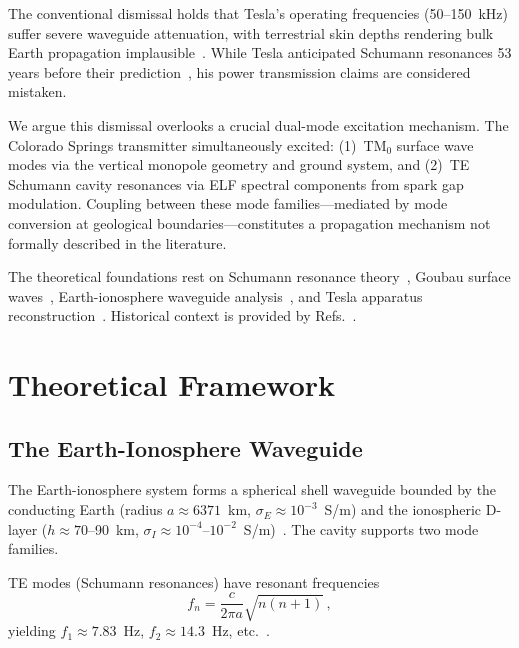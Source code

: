 \documentclass[12pt,preprint,amsmath,amssymb]{revtex4-2}
\begin{document}
The conventional dismissal holds that Tesla's operating frequencies (50--150~kHz) suffer severe
waveguide attenuation, with terrestrial skin depths rendering bulk Earth propagation
implausible~\cite{jackson1999}. While Tesla anticipated Schumann resonances 53 years before their
prediction~\cite{schumann1952}, his power transmission claims are considered mistaken.

We argue this dismissal overlooks a crucial dual-mode excitation mechanism. The Colorado Springs
transmitter simultaneously excited: (1)~TM$_0$ surface wave modes via the vertical monopole geometry
and ground system, and (2)~TE Schumann cavity resonances via ELF spectral components from spark gap
modulation. Coupling between these mode families---mediated by mode conversion at geological
boundaries---constitutes a propagation mechanism not formally described in the literature.

The theoretical foundations rest on Schumann resonance
theory~\cite{schumann1952,balser1960,nickolaenko2002}, Goubau surface
waves~\cite{sommerfeld1909,goubau1950}, Earth-ionosphere waveguide
analysis~\cite{wait1962,galejs1972,mushtak2002,bannister1979}, and Tesla apparatus
reconstruction~\cite{corum2001}. Historical context is provided by
Refs.~\cite{ratcliffe1974,belrose2001,austin1911}.

\section{Theoretical Framework}
\label{sec:theory}

\subsection{The Earth-Ionosphere Waveguide}

The Earth-ionosphere system forms a spherical shell waveguide bounded by the conducting Earth (radius
$a \approx 6371$~km, $\sigma_E \approx 10^{-3}$~S/m) and the ionospheric D-layer ($h \approx
70$--90~km, $\sigma_I \approx 10^{-4}$--$10^{-2}$~S/m)~\cite{wait1962,galejs1972}. The cavity
supports two mode families.

TE modes (Schumann resonances) have resonant frequencies
\begin{equation}
  f_n = \frac{c}{2\pi a}\sqrt{n(n+1)}\,,
  \label{eq:schumann}
\end{equation}
yielding $f_1 \approx 7.83$~Hz, $f_2 \approx 14.3$~Hz, etc.~\cite{schumann1952,sentman1990}.
\end{document}
